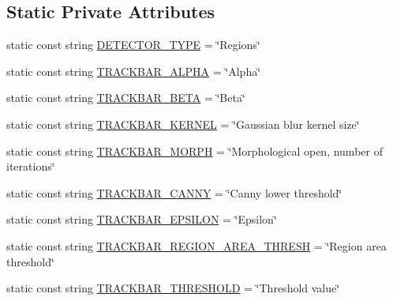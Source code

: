 \subsection*{\-Static \-Private \-Attributes}
\begin{DoxyCompactItemize}
\item 
static const string \hyperlink{classmultiscale_1_1analysis_1_1RegionDetector_a726ba9cf0864eadfda914204b9f75233}{\-D\-E\-T\-E\-C\-T\-O\-R\-\_\-\-T\-Y\-P\-E} = \char`\"{}\-Regions\char`\"{}
\item 
static const string \hyperlink{classmultiscale_1_1analysis_1_1RegionDetector_a5513e029d4d4cf249aa40364489f7a85}{\-T\-R\-A\-C\-K\-B\-A\-R\-\_\-\-A\-L\-P\-H\-A} = \char`\"{}\-Alpha\char`\"{}
\item 
static const string \hyperlink{classmultiscale_1_1analysis_1_1RegionDetector_a79d7878ed55bf12a87637896a1f44e37}{\-T\-R\-A\-C\-K\-B\-A\-R\-\_\-\-B\-E\-T\-A} = \char`\"{}\-Beta\char`\"{}
\item 
static const string \hyperlink{classmultiscale_1_1analysis_1_1RegionDetector_a79b72da59c92b368fb7894fe1f424e00}{\-T\-R\-A\-C\-K\-B\-A\-R\-\_\-\-K\-E\-R\-N\-E\-L} = \char`\"{}\-Gaussian blur kernel size\char`\"{}
\item 
static const string \hyperlink{classmultiscale_1_1analysis_1_1RegionDetector_a0358affd40f13327b10447b7fe938338}{\-T\-R\-A\-C\-K\-B\-A\-R\-\_\-\-M\-O\-R\-P\-H} = \char`\"{}\-Morphological open, number of iterations\char`\"{}
\item 
static const string \hyperlink{classmultiscale_1_1analysis_1_1RegionDetector_a8c1c5cde2b7d42ddce44b7f8208f07cc}{\-T\-R\-A\-C\-K\-B\-A\-R\-\_\-\-C\-A\-N\-N\-Y} = \char`\"{}\-Canny lower threshold\char`\"{}
\item 
static const string \hyperlink{classmultiscale_1_1analysis_1_1RegionDetector_aa3f0755a58457592ac027b42576bd312}{\-T\-R\-A\-C\-K\-B\-A\-R\-\_\-\-E\-P\-S\-I\-L\-O\-N} = \char`\"{}\-Epsilon\char`\"{}
\item 
static const string \hyperlink{classmultiscale_1_1analysis_1_1RegionDetector_a6a2711f5cabb3af04a969fe38e1ef473}{\-T\-R\-A\-C\-K\-B\-A\-R\-\_\-\-R\-E\-G\-I\-O\-N\-\_\-\-A\-R\-E\-A\-\_\-\-T\-H\-R\-E\-S\-H} = \char`\"{}\-Region area threshold\char`\"{}
\item 
static const string \hyperlink{classmultiscale_1_1analysis_1_1RegionDetector_a7548c716410a4cb88cb41498de6b509c}{\-T\-R\-A\-C\-K\-B\-A\-R\-\_\-\-T\-H\-R\-E\-S\-H\-O\-L\-D} = \char`\"{}\-Threshold value\char`\"{}
\item 

\end{DoxyCompactItemize}
